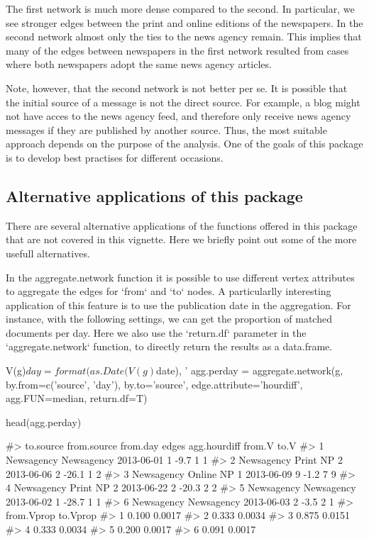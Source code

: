 The first network is much more dense compared to the second.
In particular, we see stronger edges between the print and online editions of the newspapers.
In the second network almost only the ties to the news agency remain.
This implies that many of the edges between newspapers in the first network resulted from cases where both newspapers adopt the same news agency articles.

Note, however, that the second network is not better per se.
It is possible that the initial source of a message is not the direct source.
For example, a blog might not have acces to the news agency feed, and therefore only receive news agency messages if they are published by another source.
Thus, the most suitable approach depends on the purpose of the analysis.
One of the goals of this package is to develop best practises for different occasions.

\subsection{Alternative applications of this package}

There are several alternative applications of the functions offered in this package that are not covered in this vignette. 
Here we briefly point out some of the more usefull alternatives.

In the aggregate.network function it is possible to use different vertex attributes to aggregate the edges for `from` and `to` nodes.
A particularlly interesting application of this feature is to use the publication date in the aggregation.
For instance, with the following settings, we can get the proportion of matched documents per day.
Here we also use the `return.df` parameter in the `aggregate.network` function, to directly return the results as a data.frame. 

\begin{Schunk}
\begin{Sinput}
V(g)$day = format(as.Date(V(g)$date), '%Y-%m-%d')
agg.perday = aggregate.network(g, by.from=c('source', 'day'), by.to='source', 
                                  edge.attribute='hourdiff', agg.FUN=median, 
                                  return.df=T)

head(agg.perday)
\end{Sinput}
\begin{Soutput}
#>    to.source from.source   from.day edges agg.hourdiff from.V to.V
#> 1 Newsagency  Newsagency 2013-06-01     1         -9.7      1    1
#> 2 Newsagency  Print NP 2 2013-06-06     2        -26.1      1    2
#> 3 Newsagency Online NP 1 2013-06-09     9         -1.2      7    9
#> 4 Newsagency  Print NP 2 2013-06-22     2        -20.3      2    2
#> 5 Newsagency  Newsagency 2013-06-02     1        -28.7      1    1
#> 6 Newsagency  Newsagency 2013-06-03     2         -3.5      2    1
#>   from.Vprop to.Vprop
#> 1      0.100   0.0017
#> 2      0.333   0.0034
#> 3      0.875   0.0151
#> 4      0.333   0.0034
#> 5      0.200   0.0017
#> 6      0.091   0.0017
\end{Soutput}
\end{Schunk}

